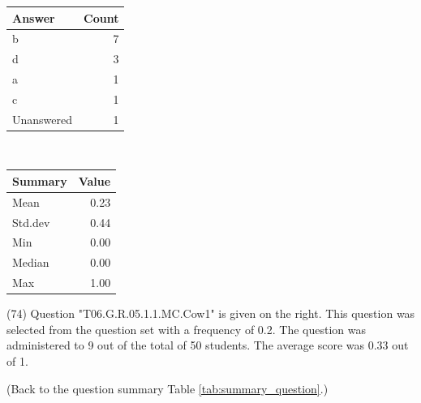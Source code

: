 \documentclass[12pt,english,nohyper]{tufte-handout}\usepackage[]{graphicx}\usepackage[]{color}
\begin{document}
\begin{center}%
\begin{tabular}{lr}
  \hline
Answer & Count \\ 
  \hline
b &   7 \\ 
  d &   3 \\ 
  a &   1 \\ 
  c &   1 \\ 
  Unanswered &   1 \\ 
   \hline
\end{tabular}
~~~~~~~~%
\begin{tabular}{lr}
  \hline
Summary & Value \\ 
  \hline
Mean & 0.23 \\ 
  Std.dev & 0.44 \\ 
  Min & 0.00 \\ 
  Median & 0.00 \\ 
  Max & 1.00 \\ 
   \hline
\end{tabular}
\end{center}\newpage{} (74) Question "T06.G.R.05.1.1.MC.Cow1" is given on the right. This question was selected from the question set with a frequency of 0.2. The question was administered to 9 out of the total of 50 students. The average score was 0.33 out of 1.

 (Back to the question summary Table \ref{tab:summary_question}.)
\end{document}
